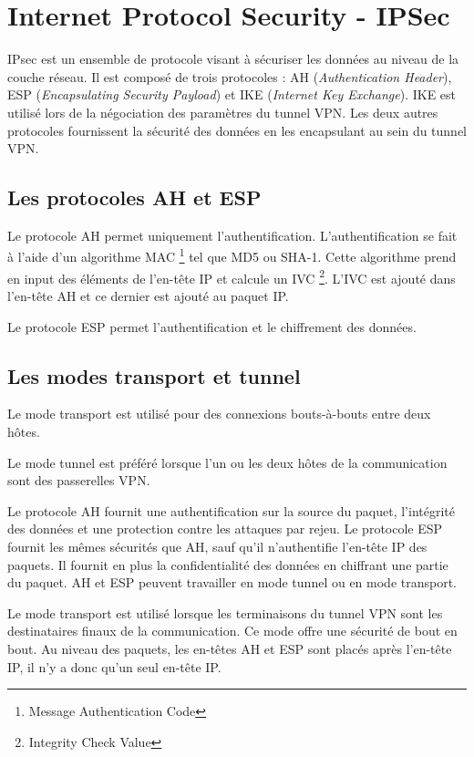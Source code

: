 \section{Internet Protocol Security - IPSec}
IPsec est un ensemble de protocole visant à sécuriser les données au niveau de la couche réseau. 
Il est composé de trois protocoles : AH (\textit{Authentication Header}), ESP (\textit{Encapsulating Security Payload}) et IKE (\textit{Internet Key Exchange}).
IKE est utilisé lors de la négociation des paramètres du tunnel VPN. 
Les deux autres protocoles fournissent la sécurité des données en les encapsulant au sein du tunnel VPN. 

\subsection{Les protocoles AH et ESP}
Le protocole AH permet uniquement l'authentification. 
L'authentification se fait à l'aide d'un algorithme MAC \footnote{Message Authentication Code} tel que MD5 ou SHA-1.
Cette algorithme prend en input des éléments de l'en-tête IP et calcule un IVC \footnote{Integrity Check Value}.
L'IVC est ajouté dans l'en-tête AH et ce dernier est ajouté au paquet IP.

Le protocole ESP permet l'authentification et le chiffrement des données.

\subsection{Les modes transport et tunnel}
Le mode transport est utilisé pour des connexions bouts-à-bouts entre deux hôtes.

Le mode tunnel est préféré lorsque l'un ou les deux hôtes de la communication sont des passerelles VPN.
 
Le protocole AH fournit une authentification sur la source du paquet, l'intégrité des données et une protection contre les attaques par rejeu. 
Le protocole ESP fournit les mêmes sécurités que AH, sauf qu'il n'authentifie l'en-tête IP des paquets. 
Il fournit en plus la confidentialité des données en chiffrant une partie du paquet. 
AH et ESP peuvent travailler en mode tunnel ou en mode transport. 

Le mode transport est utilisé lorsque les terminaisons du tunnel VPN sont les destinataires finaux de la communication. 
Ce mode offre une sécurité de bout en bout. 
Au niveau des paquets, les en-têtes AH et ESP sont placés après l'en-tête IP, il n'y a donc qu'un seul en-tête IP.

